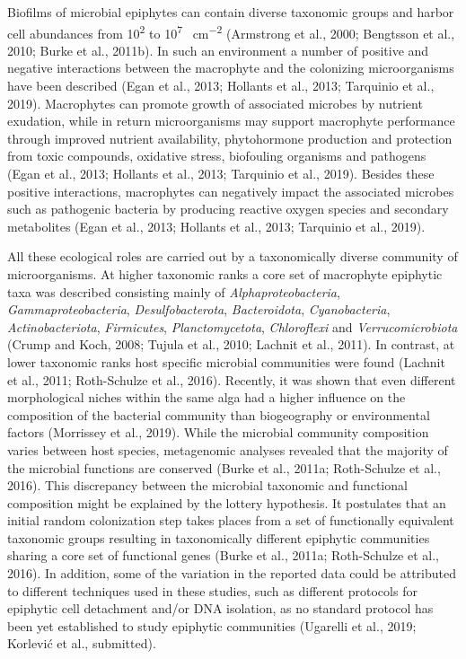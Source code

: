 \documentclass[
  12pt,
]{article}
\begin{document}
Biofilms of microbial epiphytes can contain diverse taxonomic groups and
harbor cell abundances from 10\textsuperscript{2} to
10\textsuperscript{7} \si{\cells\per\cm\squared} (Armstrong et al.,
2000; Bengtsson et al., 2010; Burke et al., 2011b). In such an
environment a number of positive and negative interactions between the
macrophyte and the colonizing microorganisms have been described (Egan
et al., 2013; Hollants et al., 2013; Tarquinio et al., 2019).
Macrophytes can promote growth of associated microbes by nutrient
exudation, while in return microorganisms may support macrophyte
performance through improved nutrient availability, phytohormone
production and protection from toxic compounds, oxidative stress,
biofouling organisms and pathogens (Egan et al., 2013; Hollants et al.,
2013; Tarquinio et al., 2019). Besides these positive interactions,
macrophytes can negatively impact the associated microbes such as
pathogenic bacteria by producing reactive oxygen species and secondary
metabolites (Egan et al., 2013; Hollants et al., 2013; Tarquinio et al.,
2019).

All these ecological roles are carried out by a taxonomically diverse
community of microorganisms. At higher taxonomic ranks a core set of
macrophyte epiphytic taxa was described consisting mainly of
\emph{Alphaproteobacteria}, \emph{Gammaproteobacteria},
\emph{Desulfobacterota}, \emph{Bacteroidota}, \emph{Cyanobacteria},
\emph{Actinobacteriota}, \emph{Firmicutes}, \emph{Planctomycetota},
\emph{Chloroflexi} and \emph{Verrucomicrobiota} (Crump and Koch, 2008;
Tujula et al., 2010; Lachnit et al., 2011). In contrast, at lower
taxonomic ranks host specific microbial communities were found (Lachnit
et al., 2011; Roth-Schulze et al., 2016). Recently, it was shown that
even different morphological niches within the same alga had a higher
influence on the composition of the bacterial community than
biogeography or environmental factors (Morrissey et al., 2019). While
the microbial community composition varies between host species,
metagenomic analyses revealed that the majority of the microbial
functions are conserved (Burke et al., 2011a; Roth-Schulze et al.,
2016). This discrepancy between the microbial taxonomic and functional
composition might be explained by the lottery hypothesis. It postulates
that an initial random colonization step takes places from a set of
functionally equivalent taxonomic groups resulting in taxonomically
different epiphytic communities sharing a core set of functional genes
(Burke et al., 2011a; Roth-Schulze et al., 2016). In addition, some of
the variation in the reported data could be attributed to different
techniques used in these studies, such as different protocols for
epiphytic cell detachment and/or DNA isolation, as no standard protocol
has been yet established to study epiphytic communities (Ugarelli et
al., 2019; Korlević et al., submitted).
\end{document}
